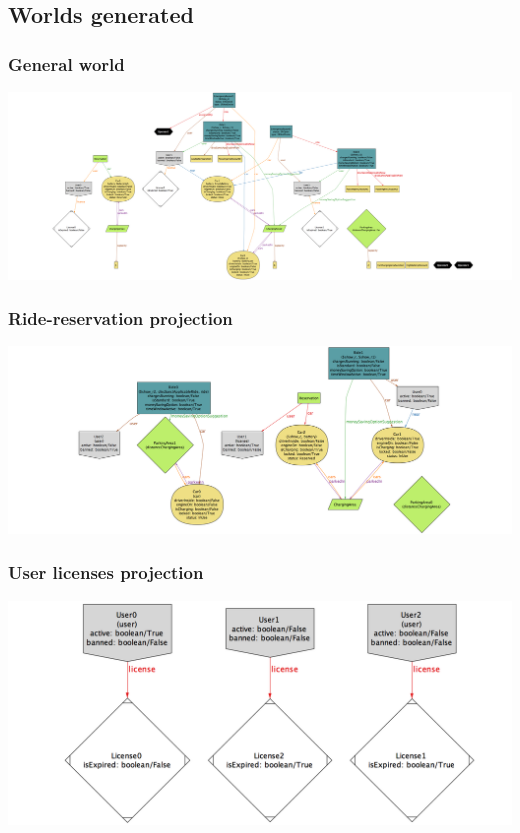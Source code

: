 	\begin{landscape}
	
	\subsection{Worlds generated}
	
	\subsubsection{General world}
		\includegraphics[width=2\textwidth, center]{img/world1.png}
	
	\subsubsection{Ride-reservation projection}
		\includegraphics[width=2\textwidth, center]{img/rides_reservations.png}
	
	\subsubsection{User licenses projection}
		\includegraphics[width=2\textwidth, center]{img/user_licenses.png}
		

\end{landscape}
